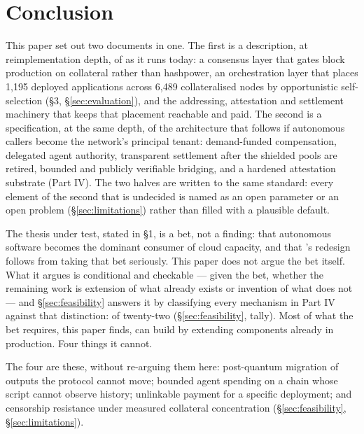 \section{Conclusion}
\label{sec:conclusion}

This paper set out two documents in one. The first is a description, at reimplementation depth, of
\Flux as it runs today: a consensus layer that gates block production on collateral rather than
hashpower, an orchestration layer that places 1,195 deployed applications across 6,489 collateralised
nodes by opportunistic self-selection (§3, \S\ref{sec:evaluation}), and the addressing, attestation and settlement
machinery that keeps that placement reachable and paid. The second is a specification, at the same
depth, of the architecture that follows if autonomous callers become the network's principal tenant:
demand-funded compensation, delegated agent authority, transparent settlement after the shielded
pools are retired, bounded and publicly verifiable bridging, and a hardened attestation substrate (Part IV). The two halves are written to the same standard: every
element of the second that is undecided is named as an open parameter or an open problem (\S\ref{sec:limitations}) rather
than filled with a plausible default.

The thesis under test, stated in §1, is a bet, not a finding: that autonomous software becomes the
dominant consumer of cloud capacity, and that \Flux's redesign follows from taking that bet seriously.
This paper does not argue the bet itself. What it argues is conditional and checkable --- given the
bet, whether the remaining work is extension of what already exists or invention of what does not ---
and \S\ref{sec:feasibility} answers it by classifying every mechanism in Part IV against that distinction: of twenty-two
 (\S\ref{sec:feasibility}, tally). Most of what the bet requires, this paper finds, \Flux can build by
extending components already in production. Four things it cannot.

The four are these, without re-arguing them here: post-quantum migration of outputs the protocol
cannot move; bounded agent spending on a chain whose script cannot observe history; unlinkable payment
for a specific deployment; and censorship resistance under measured collateral concentration
(\S\ref{sec:feasibility}, \S\ref{sec:limitations}).

